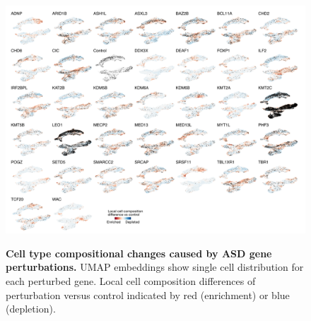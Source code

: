 \begin{figure}[h!]
    \centering
	\includegraphics[width=\textwidth]{figures/asd/Figure_S6}
    \label{fig:asdS6}
    \caption{\textbf{Cell type compositional changes caused by ASD gene perturbations.} 
    UMAP embeddings show single cell distribution for each perturbed gene. Local cell composition differences of perturbation versus control indicated by red (enrichment) or blue (depletion).}
\end{figure}



